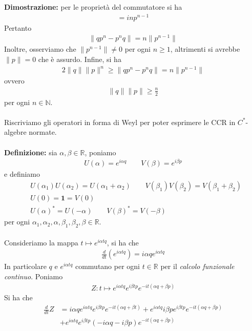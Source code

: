 \documentclass{article}
\numberwithin{equation}{subsection}
\begin{document}
\textbf{Dimostrazione:} per le proprietà del commutatore si ha
\begin{align*}
    [q, p^n] = inp^{n - 1}
\end{align*}
Pertanto
\begin{align*}
    \|qp^n - p^nq\| = n\|p^{n - 1}\|
\end{align*}
Inoltre, osserviamo che $\|p^{n - 1}\| \neq 0$ per ogni $n \geq 1$, altrimenti si avrebbe $\|p\| = 0$ che è assurdo. Infine, si ha
\begin{align*}
    2\|q\|\|p\|^n \geq \|qp^n - p^nq\| = n\|p^{n - 1}\|
\end{align*}
ovvero
\begin{align*}
    \|q\|\|p\| \geq \frac{n}{2}
\end{align*}
per ogni $n \in \mathbb{N}$. \\ \\
Riscriviamo gli operatori in forma di Weyl per poter esprimere le CCR in $C^*$-algebre normate. \\ \\
\textbf{Definizione:} sia $\alpha, \beta \in \mathbb{R}$, poniamo
\begin{align*}
    U(\alpha) = e^{i\alpha q} \qquad V(\beta) = e^{i\beta p}
\end{align*}
e definiamo
\begin{align*}
    &U(\alpha_1)U(\alpha_2) = U(\alpha_1 + \alpha_2) \qquad V(\beta_1)V(\beta_2) = V(\beta_1 + \beta_2) \\
    &U(0) = \mathbf{1} = V(0) \\
    &U(\alpha)^* = U(-\alpha) \qquad V(\beta)^* = V(-\beta)
\end{align*}
per ogni $\alpha_1, \alpha_2, \alpha, \beta_1, \beta_2, \beta \in \mathbb{R}$. \\ \\
Consideriamo la mappa $t \mapsto e^{i\alpha tq}$, si ha che
\begin{align*}
    \frac{d}{dt}(e^{i\alpha tq}) = i\alpha qe^{i\alpha tq}
\end{align*}
In particolare $q$ e $e^{i\alpha tq}$ commutano per ogni $t \in \mathbb{R}$ per il \textit{calcolo funzionale continuo}. Poniamo
\begin{align*}
    Z : t \mapsto e^{i\alpha tq}e^{i\beta tp}e^{-it(\alpha q + \beta p)}
\end{align*}
Si ha che
\begin{align*}
    \frac{d}{dt}Z &= i\alpha q e^{i\alpha tq}e^{i\beta tp}e^{-it(\alpha q + \beta t)} + e^{i\alpha tq}i\beta pe^{i\beta tp}e^{-it(\alpha q + \beta p)} \\
    &+ e^{i\alpha tq}e^{i\beta tp}(-i\alpha q - i\beta p)e^{-it(\alpha q + \beta p)}
\end{align*}
\end{document}
